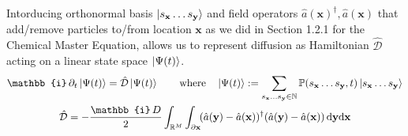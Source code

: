 \documentclass{article}[12pt]
\numberwithin{equation}{section}
\begin{document}
Intorducing orthonormal basis $\ket{s_{\mathbf{x}}\dots s_{\mathbf{y}}}$ and field
operators $\hat{a}(\mathbf{x})^{\dagger},\hat{a}(\mathbf{x})$ that add/remove particles
to/from location $\mathbf{x}$ as we did in Section 1.2.1 for the Chemical Master Equation,
allows us to represent diffusion as Hamiltonian $\hat{\mathcal{D}}$ acting on a linear
state space $\ket{\Psi(t)}$.
\begin{align}
	\mathbb{i}\,\partial_t\ket{\Psi(t)}
	=\hat{\mathcal{D}}\ket{\Psi(t)}
	\qquad\text{where}\quad
	\ket{\Psi(t)}:=\sum_{s_{\mathbf{x}}\dots s_{\mathbf{y}}\in\mathbb{N}}
	\mathbb{P}(s_{\mathbf{x}}\dots s_{\mathbf{y}},t)
	\ket{s_{\mathbf{x}}\dots s_{\mathbf{y}}}
	\label{eq:diffusionschrodinger}
\\
	\hat{\mathcal{D}} = -\frac{\mathbb{i}\,D}{2}
	\int_{\mathbb{R}^{M}}\int_{\partial\mathbf{x}}\!
		(\hat{a}(\mathbf{y})-\hat{a}(\mathbf{x}))^{\dagger}(\hat{a}(\mathbf{y})-\hat{a}(\mathbf{x}))
	\,\mathrm{d}\mathbf{y}\mathrm{d}\mathbf{x}
	\qquad\qquad\quad
	\label{eq:diffusionhamiltonian}
\end{align}
\pagebreak
\end{document}
